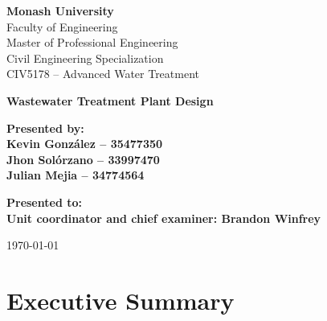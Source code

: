 \documentclass[11pt]{article}
\begin{document}
\pagestyle{empty}

\begin{titlepage}
  \thispagestyle{empty}  %
  
  \begin{flushleft}
  \textbf{Monash University}\\
  Faculty of Engineering\\
  Master of Professional Engineering\\
  Civil Engineering Specialization\\
  CIV5178 – Advanced Water Treatment
  \end{flushleft}
  
  \vspace{2cm}
  
  \begin{center}
      {\Huge \bfseries Wastewater Treatment Plant Design \\[0.5cm]}
  
      \vspace{1.5cm}
  
      {\large \bfseries
      Presented by:\\
      Kevin González – 35477350\\
      Jhon Solórzano – 33997470\\
      Julian Mejia – 34774564
      }
  
      \vspace{1cm}
  
      {\large \bfseries
      Presented to:\\
      Unit coordinator and chief examiner: Brandon Winfrey
      }
  \end{center}
  
  \vfill
  
  \begin{center}
      {\normalsize \today}
  \end{center}
  \end{titlepage}
  

\section*{Executive Summary}
\end{document}
